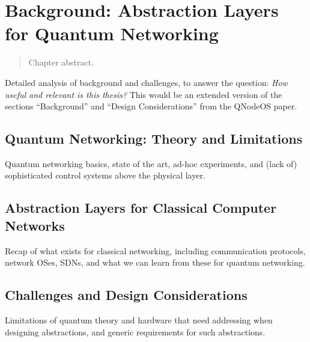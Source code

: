 \chapter{Background: Abstraction Layers for Quantum Networking}
\label{chp:background}

\begin{refsection}

\begin{abstract}
Chapter abstract.
\end{abstract}

\newpage


\noindent
Detailed analysis of background and challenges, to answer the question: \emph{How useful and
relevant is this thesis?} This would be an extended version of the sections ``Background'' and
``Design Considerations'' from the QNodeOS paper.

\section{Quantum Networking: Theory and Limitations}

Quantum networking basics, state of the art, ad-hoc experiments, and (lack of) sophisticated control
systems above the physical layer.

\section{Abstraction Layers for Classical Computer Networks}

Recap of what exists for classical networking, including communication protocols, network OSes,
SDNs, and what we can learn from these for quantum networking.

\section{Challenges and Design Considerations}

Limitations of quantum theory and hardware that need addressing when designing abstractions, and
generic requirements for such abstractions.

\printbibliography[heading=subbibintoc,title={References}]

\end{refsection}
